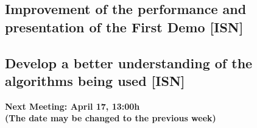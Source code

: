 \documentclass{article}
\begin{document}
	\subsection{Improvement of the performance and presentation of the First Demo  [ISN]}
	
	\subsection{Develop a better understanding of the algorithms being used [ISN] }
\vspace{0.5cm}


\begin {center}
{\Large \textbf{Next Meeting: April 17, 13:00h}}\\[0.3cm]
{\large \textbf{(The date may be changed to the previous week)}}
\end{center}
\end{document}
